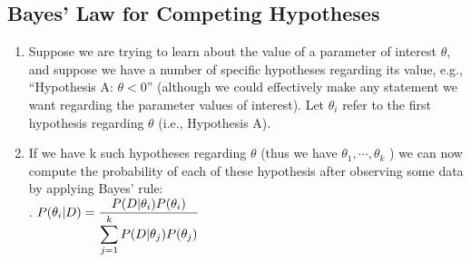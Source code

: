 \subsection{Bayes’ Law for Competing Hypotheses}

\begin{enumerate}
    \item Suppose we are trying to learn about the value of a parameter of interest $\theta $, and suppose we have a number of specific hypotheses regarding its value, e.g., “Hypothesis A: $\theta  < 0$” (although we could effectively make any statement we want regarding the parameter values of interest). 
    Let $\theta _i$ refer to the first hypothesis regarding $\theta$  (i.e., Hypothesis A). 
    \hfill \cite{statistics/book/Statistics-for-Data-Scientists/Maurits-Kaptein}

    \item If we have k such hypotheses regarding $\theta$  (thus we have $\theta _1, \cdots , \theta _k$ ) we can now compute the probability of each of these hypothesis after observing some data by applying Bayes’ rule:
    \hfill \cite{statistics/book/Statistics-for-Data-Scientists/Maurits-Kaptein}
    \\[0.2cm]
    .\hfill
    $
        P(\theta _i |D) 
        = \dfrac{P(D|\theta _i ) P(\theta _i )}{\displaystyle\sum^k _{j=1} P(D|\theta _j ) P(\theta _j ) }
    $
    \hfill \cite{statistics/book/Statistics-for-Data-Scientists/Maurits-Kaptein}

\end{enumerate}









